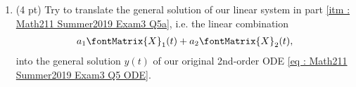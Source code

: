 


\begin{enumerate}[resume,label=(\alph*)]
\item\label{itm : Math211 Summer2019 Exam3 Q5e} (4 pt) Try to translate the general solution of our linear system in part \ref{itm : Math211 Summer2019 Exam3 Q5a}, i.e. the linear combination
\begin{align*}
a_{1} \fontMatrix{X}_{1}(t) + a_{2} \fontMatrix{X}_{2}(t),
\end{align*}
into the general solution $y(t)$ of our original 2nd-order ODE \eqref{eq : Math211 Summer2019 Exam3 Q5 ODE}. 
\end{enumerate}


